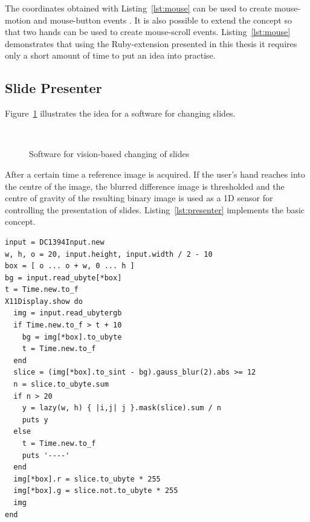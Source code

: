 \documentclass[12pt,a4paper,oneside,openright]{book}
\newcommand{\fig}[1]{Figure~\ref{fig:#1}}
\newcommand{\lst}[1]{Listing~\ref{lst:#1}}
\begin{document}
\begin{CJK}{UTF8}{}
The coordinates obtained with \lst{mouse} can be used to create mouse-motion and mouse-button events \citep{wilson2006robust}. It is also possible to extend the concept so that two hands can be used to create mouse-scroll events. \lst{mouse} demonstrates that using the Ruby-extension presented in this thesis it requires only a short amount of time to put an idea into practise.

\subsection{Slide Presenter}
\fig{presenter} illustrates the idea for a software for changing slides.
\begin{figure}[htbp]
   \begin{center}
     \\
     \caption{Software for vision-based changing of slides\label{fig:presenter}}
   \end{center}
\end{figure}
After a certain time a reference image is acquired. If the user's hand reaches into the centre of the image, the blurred difference image is thresholded and the centre of gravity of the resulting binary image is used as a \ac{1D} sensor for controlling the presentation of slides. \lst{presenter} implements the basic concept.
\lstset{language=Ruby,frame=single,numbers=none}
\begin{lstlisting}[float,caption={Vision-based changing of slides},escapechar=\$,label=lst:presenter]
input = DC1394Input.new
w, h, o = 20, input.height, input.width / 2 - 10
box = [ o ... o + w, 0 ... h ]
bg = input.read_ubyte[*box]
t = Time.new.to_f
X11Display.show do
  img = input.read_ubytergb
  if Time.new.to_f > t + 10
    bg = img[*box].to_ubyte
    t = Time.new.to_f
  end
  slice = (img[*box].to_sint - bg).gauss_blur(2).abs >= 12
  n = slice.to_ubyte.sum
  if n > 20
    y = lazy(w, h) { |i,j| j }.mask(slice).sum / n
    puts y
  else
    t = Time.new.to_f
    puts '----'
  end
  img[*box].r = slice.to_ubyte * 255
  img[*box].g = slice.not.to_ubyte * 255
  img
end
\end{lstlisting}


\end{CJK}
\end{document}
